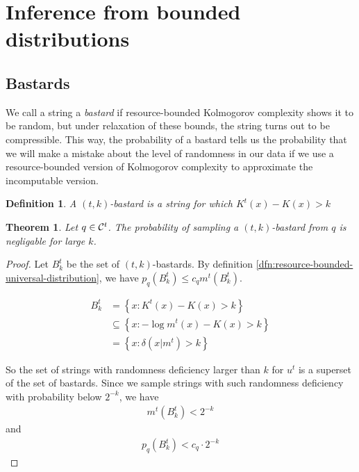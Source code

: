\documentclass[10pt,a4paper,oneside]{article}
\newtheorem{thm}{Theorem}
\newtheorem{dfn}{Definition}
\begin{document}
\section*{Inference from bounded distributions}

\subsection*{Bastards}

We call a string a \emph{bastard} if resource-bounded Kolmogorov complexity shows it to be random, but under relaxation of these bounds, the string turns out to be compressible. This way, the probability of a bastard tells us the probability that we will make a mistake about the level of randomness in our data if we use a resource-bounded version of Kolmogorov complexity to approximate the incomputable version.
  

\begin{dfn}
A \emph{$(t, k)$-bastard} is a string for which $K^t(x) - K(x) > k$
\end{dfn}

\begin{thm}
Let $q \in {\cal C}^t$. The probability of sampling a $(t, k)$-bastard from $q$ is negligable for large $k$.
\end{thm}
\begin{proof}

Let $B^t_k$ be the set of $(t, k)$-bastards. By definition \ref{dfn:resource-bounded-universal-distribution}, we have $p_q(B^t_k) \leq c_q m^t(B^t_k)$.

\begin{align*}
B^t_k &= \left\{x : K^t(x) - K(x) > k\right\} \\ 
	&\subseteq \left\{x : - \log m^t(x) - K(x) > k\right\} \\
	&= \left\{x : \delta(x | m^t) > k\right\}
\end{align*}

So the set of strings with randomness deficiency larger than $k$ for $u^t$ is a superset of the set of bastards. Since we sample strings with such randomness deficiency with probability below $2^{-k}$, we have
\begin{align*}
m^t\left(B^t_k\right) < 2^{-k} 
\end{align*}
and 
\begin{align*}
p_q\left(B^t_k\right) < c_q \cdot 2^{-k} 
\end{align*}
\end{proof}
\end{document}
